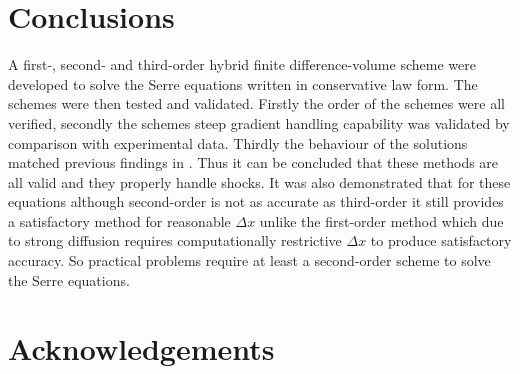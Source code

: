 \documentclass[SingleSpace,12pt]{Serre_ASCE}
\begin{document}
\section{Conclusions}
\label{section:Conclusions}
A first-, second- and third-order hybrid finite difference-volume scheme were developed to solve the Serre equations written in conservative law form. The schemes were then tested and validated. Firstly the order of the schemes were all verified, secondly the schemes steep gradient handling capability was validated by comparison with experimental data. Thirdly the behaviour of the solutions matched previous findings in . Thus it can be concluded that these methods are all valid and they properly handle shocks. It was also demonstrated that for these equations although second-order is not as accurate as third-order it still provides a satisfactory method for reasonable $\Delta x$ unlike the first-order method which due to strong diffusion requires computationally restrictive $\Delta x$ to produce satisfactory accuracy. So practical problems require at least a second-order scheme to solve the Serre equations. 
\section{Acknowledgements}



\end{document}
